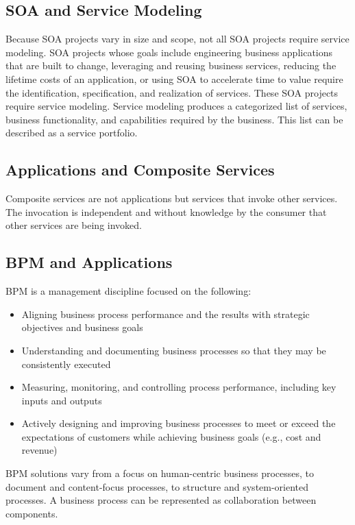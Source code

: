 \documentclass[12pt,a4paper,final,twoside,onecolumn,titlepage]{book}
\begin{document}
\subsection{SOA and Service Modeling}
Because \gls{SOA} projects vary in size and scope, not all \gls{SOA} projects require service modeling. \gls{SOA} projects whose goals include engineering business applications that are built to change, leveraging and reusing business services, reducing the lifetime costs of an application, or using \gls{SOA} to accelerate time to value require the identification, specification, and realization of services. These \gls{SOA} projects require service modeling. Service modeling produces a categorized list of services, business functionality, and capabilities required by the business. This list can be described as a service portfolio.
\subsection{Applications and Composite Services}
Composite services are not applications but services that invoke other services. The invocation is independent and without knowledge by the consumer that other services are being invoked.
\subsection{BPM and Applications}
\gls{BPM} is a management discipline focused on the following:
\begin{itemize}
\item Aligning business process performance and the results with strategic objectives and business goals
\item Understanding and documenting business processes so that they may be consistently executed
\item Measuring, monitoring, and controlling process performance, including key inputs and outputs
\item Actively designing and improving business processes to meet or exceed the expectations of customers while achieving business goals (e.g., cost and revenue)
\end{itemize}
\gls{BPM} solutions vary from a focus on human-centric business processes, to document and content-focus processes, to structure and system-oriented processes. A business process can be represented as collaboration between components.
\end{document}
